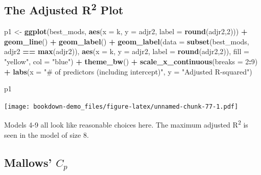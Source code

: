 \documentclass[]{book}
\newenvironment{Shaded}{\begin{snugshade}}{\end{snugshade}}
\newcommand{\KeywordTok}[1]{\textcolor[rgb]{0.13,0.29,0.53}{\textbf{#1}}}
\newcommand{\DataTypeTok}[1]{\textcolor[rgb]{0.13,0.29,0.53}{#1}}
\newcommand{\DecValTok}[1]{\textcolor[rgb]{0.00,0.00,0.81}{#1}}
\newcommand{\StringTok}[1]{\textcolor[rgb]{0.31,0.60,0.02}{#1}}
\newcommand{\OperatorTok}[1]{\textcolor[rgb]{0.81,0.36,0.00}{\textbf{#1}}}
\newcommand{\NormalTok}[1]{#1}
\theoremstyle{definition}
\theoremstyle{definition}
\theoremstyle{definition}
\theoremstyle{remark}
\begin{document}
\subsection{\texorpdfstring{The Adjusted R\textsuperscript{2}
Plot}{The Adjusted R2 Plot}}\label{the-adjusted-r2-plot}

\begin{Shaded}
\begin{Highlighting}[]
\NormalTok{p1 <-}\StringTok{ }\KeywordTok{ggplot}\NormalTok{(best_mods, }\KeywordTok{aes}\NormalTok{(}\DataTypeTok{x =}\NormalTok{ k, }\DataTypeTok{y =}\NormalTok{ adjr2,}
                            \DataTypeTok{label =} \KeywordTok{round}\NormalTok{(adjr2,}\DecValTok{2}\NormalTok{))) }\OperatorTok{+}
\StringTok{    }\KeywordTok{geom_line}\NormalTok{() }\OperatorTok{+}
\StringTok{    }\KeywordTok{geom_label}\NormalTok{() }\OperatorTok{+}
\StringTok{    }\KeywordTok{geom_label}\NormalTok{(}\DataTypeTok{data =} \KeywordTok{subset}\NormalTok{(best_mods,}
\NormalTok{                             adjr2 }\OperatorTok{==}\StringTok{ }\KeywordTok{max}\NormalTok{(adjr2)),}
               \KeywordTok{aes}\NormalTok{(}\DataTypeTok{x =}\NormalTok{ k, }\DataTypeTok{y =}\NormalTok{ adjr2, }\DataTypeTok{label =} \KeywordTok{round}\NormalTok{(adjr2,}\DecValTok{2}\NormalTok{)),}
               \DataTypeTok{fill =} \StringTok{"yellow"}\NormalTok{, }\DataTypeTok{col =} \StringTok{"blue"}\NormalTok{) }\OperatorTok{+}
\StringTok{    }\KeywordTok{theme_bw}\NormalTok{() }\OperatorTok{+}
\StringTok{    }\KeywordTok{scale_x_continuous}\NormalTok{(}\DataTypeTok{breaks =} \DecValTok{2}\OperatorTok{:}\DecValTok{9}\NormalTok{) }\OperatorTok{+}
\StringTok{    }\KeywordTok{labs}\NormalTok{(}\DataTypeTok{x =} \StringTok{"# of predictors (including intercept)"}\NormalTok{,}
         \DataTypeTok{y =} \StringTok{"Adjusted R-squared"}\NormalTok{)}

\NormalTok{p1}
\end{Highlighting}
\end{Shaded}

\texttt{[image: bookdown-demo\_files/figure-latex/unnamed-chunk-77-1.pdf]}

Models 4-9 all look like reasonable choices here. The maximum adjusted
R\textsuperscript{2} is seen in the model of size 8.

\subsection{\texorpdfstring{Mallows'
\(C_p\)}{Mallows' C\_p}}\label{mallows-c_p}
\end{document}
